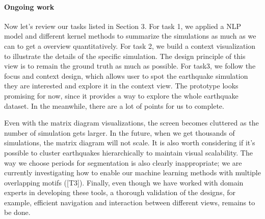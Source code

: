 \paragraph*{Ongoing work}
\label{sec:conclusion}

Now let's review our tasks listed in Section 3. For task 1, we applied a NLP model and different kernel methods to summarize the simulations as much as we can to get a overview quantitatively. For task 2, we build a context visualization to illustrate the details of the specific simulation. The design principle of this view is to remain the ground truth as much as possible. For task3, we follow the focus and context design, which allows user to spot the earthquake simulation they are interested and explore it in the context view. The prototype looks promising for now, since it provides a way to explore the whole earthquake dataset. In the meanwhile, there are  a lot of points for us to complete.

Even with the matrix diagram visualizations, the screen becomes cluttered as the number of simulation gets larger. In the future, when we get thousands of simulations, the matrix diagram will not scale. It is also worth considering if it's possible to cluster earthquakes hierarchically to maintain visual scalability. The way we choose periods for segmentation is also clearly inappropriate; we are currently investigating how to enable our machine learning methods with multiple overlapping motifs ([T3]).
Finally, even though we have worked with domain experts in developing these tools, a thorough validation of the designs, for example,   efficient navigation and interaction between different views, remains to be done.
